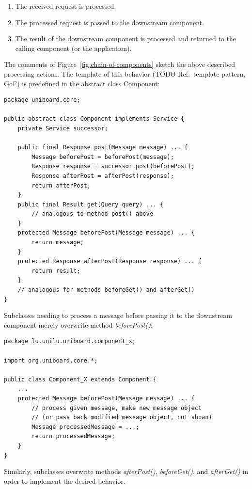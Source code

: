 \documentclass[oneside]{scrreprt}
\newcommand{\fig}[1]{Figure~\ref{#1}}
\begin{document}
\begin{enumerate}
	\item The received request is processed.
	\item The processed request is passed to the downstream
		component.
	\item The result of the downstream component is
		processed and returned to the calling
		component (or the application).
\end{enumerate}

The comments of \fig{fig:chain-of-components} sketch
the above described processing actions. The template
of this behavior (TODO Ref.\ template pattern, GoF)
is predefined in the abstract class Component:

\begin{lstlisting}
package uniboard.core;

public abstract class Component implements Service {
    private Service successor;

    public final Response post(Message message) ... {
        Message beforePost = beforePost(message);
        Response response = successor.post(beforePost);
        Response afterPost = afterPost(response);
        return afterPost;
    }
    public final Result get(Query query) ... {
        // analogous to method post() above
    }
    protected Message beforePost(Message message) ... {
        return message;
    }
    protected Response afterPost(Response response) ... {
        return result;
    }
    // analogous for methods beforeGet() and afterGet()
}
\end{lstlisting}

Subclasses needing to process a message before passing it
to the downstream component merely overwrite method
\emph{beforePost()}:

\begin{lstlisting}
package lu.unilu.uniboard.component_x;

import org.uniboard.core.*;

public class Component_X extends Component {
    ...
    protected Message beforePost(Message message) ... {
        // process given message, make new message object
        // (or pass back modified message object, not shown)
        Message processedMessage = ...;
        return processedMessage;
    }
}
\end{lstlisting}

Similarly, subclasses overwrite methods \emph{afterPost()},
\emph{beforeGet()}, and \emph{afterGet()} in order to implement
the desired behavior.
\end{document}
